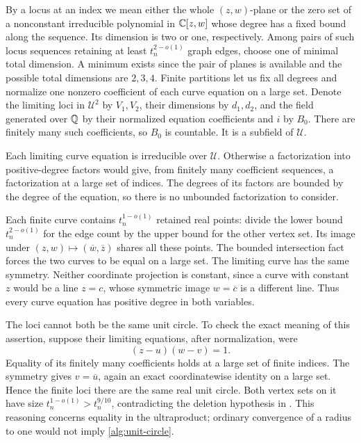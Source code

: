 By a locus at an index we mean either the whole \((z,w)\)-plane or the
zero set of a nonconstant irreducible polynomial in \(\mathbb C[z,w]\) whose
degree has a fixed bound along the sequence. Its dimension is two or
one, respectively. Among pairs of such locus sequences retaining at least \(t_n^{2-o(1)}\) graph edges, choose one of minimal total dimension. A minimum
exists since the pair of planes is available and the possible total
dimensions are \(2,3,4\). Finite partitions let us fix all degrees and
normalize one nonzero coefficient of each curve equation on a large
set. Denote the limiting loci in \(\mathcal U^2\) by \(V_1,V_2\), their
dimensions by \(d_1,d_2\), and the field generated over \(\mathbb Q\) by their
normalized equation coefficients and \(i\) by \(B_0\). There are finitely
many such coefficients, so \(B_0\) is countable. It is a subfield of
\(\mathcal U\).

Each limiting curve equation is irreducible over \(\mathcal U\).
Otherwise a factorization into positive-degree factors would give, from
finitely many coefficient sequences, a factorization at a large set of
indices. The degrees of its factors are bounded by the degree of the
equation, so there is no unbounded factorization to consider.

Each finite curve contains \(t_n^{1-o(1)}\) retained real points: divide
the lower bound \(t_n^{2-o(1)}\) for the edge count by the upper bound for the other vertex set. Its
image under \((z,w)\mapsto(\overline w,\overline z)\) shares all these
points. The bounded intersection fact forces the two curves to be equal
on a large set. The limiting curve has the same symmetry. Neither
coordinate projection is constant, since a curve with constant \(z\)
would be a line \(z=c\), whose symmetric image \(w=\overline c\) is a
different line. Thus every curve equation has positive degree in both
variables.

The loci cannot both be the same unit circle. To check the exact meaning
of this assertion, suppose their limiting equations, after normalization,
were
\begin{equation}\label{alg:unit-circle}
 (z-u)(w-v)=1.
\end{equation}
Equality of its finitely many coefficients holds at a large set of
finite indices. The symmetry gives \(v=\overline u\), again an exact
coordinatewise identity on a large set. Hence the finite loci there are
the same real unit circle. Both vertex sets on it have size
\(t_n^{1-o(1)}>t_n^{9/10}\), contradicting the deletion hypothesis in
. This reasoning concerns equality in the
ultraproduct; ordinary convergence of a radius to one would not imply
\eqref{alg:unit-circle}.

